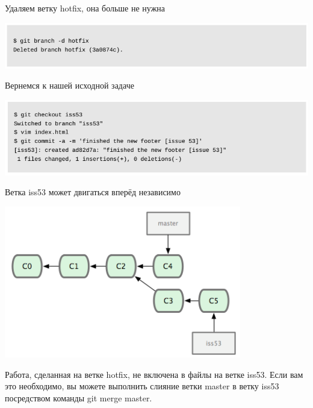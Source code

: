 \documentclass{beamer}
\begin{document}
\begin{frame}
\begin{block}{Удаляем ветку hotfix, она больше не нужна}
\begin{center}
\includegraphics[scale=0.5]{images/ex-13.png}
\end{center}
\end{block}
\begin{block}{Вернемся к нашей исходной задаче}
\begin{center}
\includegraphics[scale=0.5]{images/ex-14.png}
\end{center}
\end{block}
\end{frame}

\begin{frame}
\begin{block}{Ветка iss53 может двигаться вперёд независимо}
\begin{center}
\includegraphics[scale=0.5]{images/ex-15.png}
\end{center}
\end{block}
Работа, сделанная на ветке hotfix, не включена в файлы на ветке iss53. Если вам это необходимо, вы можете выполнить слияние ветки master в ветку iss53 посредством команды git merge master.
\end{frame}
\end{document}
